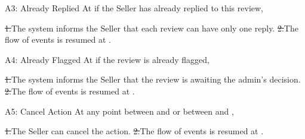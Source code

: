 \begin{flowblock}{A3: Already Replied}
At  if the Seller has already replied to this review,\par
\st{1.}{The system informs the Seller that each review can have only one reply.}
\st{2.}{The flow of events is resumed at .}
\end{flowblock}
\begin{flowblock}{A4: Already Flagged}
At  if the review is already flagged,\par
\st{1.}{The system informs the Seller that the review is awaiting the admin's decision.}
\st{2.}{The flow of events is resumed at .}
\end{flowblock}
\begin{flowblock}{A5: Cancel Action}
At any point between  and  or between  and ,\par
\st{1.}{The Seller can cancel the action.}
\st{2.}{The flow of events is resumed at .}
\end{flowblock}
